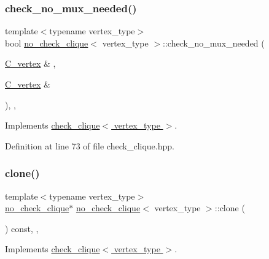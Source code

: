 \subsubsection{\texorpdfstring{check\+\_\+no\+\_\+mux\+\_\+needed()}{check\_no\_mux\_needed()}}
{\footnotesize\ttfamily template$<$typename vertex\+\_\+type$>$ \\
bool \hyperlink{structno__check__clique}{no\+\_\+check\+\_\+clique}$<$ vertex\+\_\+type $>$\+::check\+\_\+no\+\_\+mux\+\_\+needed (\begin{DoxyParamCaption}\item[{\hyperlink{clique__covering__graph_8hpp_a9cb45047ea8c5ed95a8cfa90494345aa}{C\+\_\+vertex} \&}]{,  }\item[{\hyperlink{clique__covering__graph_8hpp_a9cb45047ea8c5ed95a8cfa90494345aa}{C\+\_\+vertex} \&}]{ }\end{DoxyParamCaption})\hspace{0.3cm}{\ttfamily [inline]}, {\ttfamily [override]}, {\ttfamily [virtual]}}



Implements \hyperlink{structcheck__clique_ad6179189438c0cf415aa52e9c831e854}{check\+\_\+clique$<$ vertex\+\_\+type $>$}.



Definition at line 73 of file check\+\_\+clique.\+hpp.

\mbox{\label{structno__check__clique_aa177c43e3c4736962a041c45441e0ec0}} 
\subsubsection{\texorpdfstring{clone()}{clone()}}
{\footnotesize\ttfamily template$<$typename vertex\+\_\+type$>$ \\
\hyperlink{structno__check__clique}{no\+\_\+check\+\_\+clique}$\ast$ \hyperlink{structno__check__clique}{no\+\_\+check\+\_\+clique}$<$ vertex\+\_\+type $>$\+::clone (\begin{DoxyParamCaption}{ }\end{DoxyParamCaption}) const\hspace{0.3cm}{\ttfamily [inline]}, {\ttfamily [override]}, {\ttfamily [virtual]}}



Implements \hyperlink{structcheck__clique_a2a91d2e947216240ac91ea541fd63182}{check\+\_\+clique$<$ vertex\+\_\+type $>$}.



